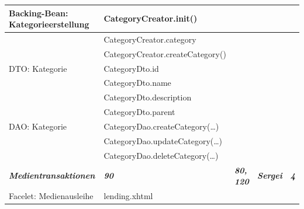 \documentclass{article}
\begin{document}
\begin{longtable}{|l|l|l|l|l|}
\hline
Backing-Bean: Kategorieerstellung       & CategoryCreator.init()                   &                           &                             &                        \\ 
\hline
                                        & CategoryCreator.category                 &                           &                             &                        \\ 
\hline
                                        & CategoryCreator.createCategory()         &                           &                             &                        \\ 
\hline
DTO: Kategorie                          & CategoryDto.id                           &                           &                             &                        \\ 
\hline
                                        & CategoryDto.name                         &                           &                             &                        \\ 
\hline
                                        & CategoryDto.description                  &                           &                             &                        \\ 
\hline
                                        & CategoryDto.parent                       &                           &                             &                        \\ 
\hline
DAO: Kategorie                          & CategoryDao.createCategory(…)            &                           &                             &                        \\ 
\hline
                                        & CategoryDao.updateCategory(…)            &                           &                             &                        \\ 
\hline
                                        & CategoryDao.deleteCategory(…)            &                           &                             &                        \\ 
\hline
\textbf{\textit{Medientransaktionen}}   & \textbf{\textit{90}}                     & \textbf{\textit{80, 120}} & \textbf{\textit{Sergei}}    & \textbf{\textit{4}}    \\ 
\hline
Facelet: Medienausleihe                 & lending.xhtml                            &                           &                             &                        \\ 

\end{longtable}
\end{document}
